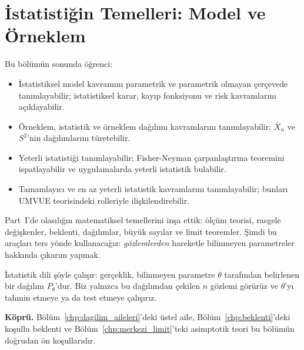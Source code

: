 \chapter{İstatistiğin Temelleri: Model ve Örneklem}
\label{chp:istatistik_temelleri}


\begin{kazanimlar}
Bu bölümün sonunda öğrenci:
\begin{itemize}
  \item İstatistiksel model kavramını parametrik ve parametrik olmayan çerçevede tanımlayabilir;
        istatistiksel karar, kayıp fonksiyonu ve risk kavramlarını açıklayabilir.
  \item Örneklem, istatistik ve örneklem dağılımı kavramlarını tanımlayabilir;
        $\bar{X}_n$ ve $S^2$'nin dağılımlarını türetebilir.
  \item Yeterli istatistiği tanımlayabilir; Fisher-Neyman çarpanlaştırma teoremini
        ispatlayabilir ve uygulamalarda yeterli istatistik bulabilir.
  \item Tamamlayıcı ve en az yeterli istatistik kavramlarını tanımlayabilir;
        bunları UMVUE teorisindeki rolleriyle ilişkilendirebilir.
\end{itemize}
\end{kazanimlar}

\begin{motivasyon}
Part~I'de olasılığın matematiksel temellerini inşa ettik: ölçüm teorisi,
rasgele değişkenler, beklenti, dağılımlar, büyük sayılar ve limit teoremler.
Şimdi bu araçları ters yönde kullanacağız: \emph{gözlemlerden} hareketle
bilinmeyen parametreler hakkında çıkarım yapmak.

İstatistik dili şöyle çalışır: gerçeklik, bilinmeyen parametre $\theta$ tarafından
belirlenen bir dağılım $P_\theta$'dur. Biz yalnızca bu dağılımdan çekilen
$n$ gözlemi görürüz ve $\theta$'yı tahmin etmeye ya da test etmeye çalışırız.

\medskip
\textbf{Köprü.} Bölüm~\ref{chp:dagilim_aileleri}'deki üstel aile,
Bölüm~\ref{chp:beklenti}'deki koşullu beklenti ve
Bölüm~\ref{chp:merkezi_limit}'teki asimptotik teori bu bölümün doğrudan ön koşullarıdır.
\end{motivasyon}

